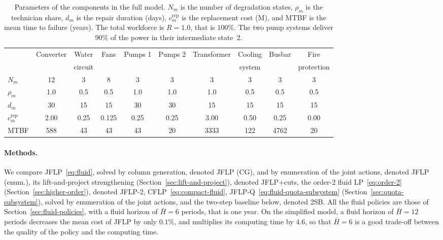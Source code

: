 \documentclass{article}
\begin{document}
\begin{table}[H]
\centering
\small
\begin{tabular}{lccccccccc}
\toprule
 & Converter & Water & Fans & Pumps 1 & Pumps 2 & Transformer & Cooling & Busbar & Fire \\
 & & circuit & & & & & system & & protection \\
\midrule
$N_m$ & 12 & 3 & 8 & 3 & 3 & 3 & 3 & 3 & 3 \\
$\rho_m$ & 1.0 & 0.5 & 0.5 & 1.0 & 1.0 & 1.0 & 0.5 & 0.5 & 0.5 \\
$d_m$ & 30 & 15 & 15 & 30 & 30 & 15 & 15 & 15 & 15 \\
$c^{\mathrm{rep}}_m$ & 2.00 & 0.25 & 0.125 & 0.25 & 0.25 & 3.00 & 0.50 & 0.25 & 0.00 \\
MTBF & 588 & 43 & 43 & 43 & 20 & 3333 & 122 & 4762 & 20 \\
\bottomrule
\end{tabular}
\caption{Parameters of the components in the full model. $N_m$ is the number of degradation states, $\rho_m$ is the
technician share, $d_m$ is the repair duration (days), $c^{\mathrm{rep}}_m$ is the replacement cost (M), and MTBF is the
mean time to failure (years). The total workforce is $R=1.0$, that is $100\%$. The two pump systems deliver $90\%$ of
the power in their intermediate state~2.}
\label{tab:component-parameters}
\end{table}

\paragraph{Methods.} We compare JFLP~\eqref{eq:fluid}, solved by column generation, denoted JFLP (CG), and by enumeration of the joint actions, denoted JFLP (enum.), its lift-and-project strengthening (Section~\ref{sec:lift-and-project}), denoted JFLP+cuts, the order-$2$ fluid LP~\eqref{eq:order-2} (Section~\ref{sec:higher-order}), denoted JFLP-2, CFLP~\eqref{eq:compact-fluid}, JFLP-Q~\eqref{eq:fluid-quota-subsystem} (Section~\ref{sec:quota-subsystem}), solved by enumeration of the joint actions, and the two-step baseline below, denoted 2SB. All
the fluid policies are those of Section~\ref{sec:fluid-policies}, with a fluid horizon of $\bar H = 6$ periods, that is
one year. On the simplified model, a fluid horizon of $\bar H = 12$ periods decreases the mean cost of JFLP by only $0.1\%$, and multiplies its computing time by $4.6$, so that $\bar H = 6$ is a good trade-off between the
quality of the policy and the computing time.
\end{document}
